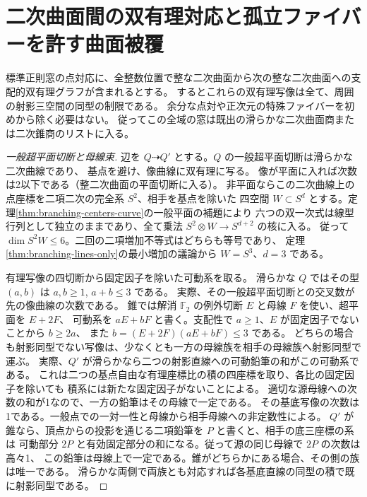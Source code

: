 \section{二次曲面間の双有理対応と孤立ファイバーを許す曲面被覆}
\label{sec:birational-quadric-chains}
\begin{theorem}\label{thm:birational-quadric-chains}
標準正則窓の点対応に、全整数位置で整な二次曲面から次の整な二次曲面への支配的双有理グラフが含まれるとする。
するとこれらの双有理写像は全て、周囲の射影三空間の同型の制限である。
余分な点対や正次元の特殊ファイバーを初めから除く必要はない。
従ってこの全域の窓は既出の滑らかな二次曲面商または二次錐商のリストに入る。
\end{theorem}

\begin{proof}[一般超平面切断と母線束]
辺を $Q\dashrightarrow Q'$ とする。$Q$ の一般超平面切断は滑らかな二次曲線であり、
基点を避け、像曲線に双有理に写る。
像が平面に入れば次数は2以下である（整二次曲面の平面切断に入る）。
非平面ならこの二次曲線上の点座標を二項二次の完全系 $S^2$、相手を基点を除いた
四空間 $W\subset S^d$ とする。定理\ref{thm:branching-centers-curve}の一般平面の補題により
六つの双一次式は線型行列として独立のままであり、全て乗法 $S^2\otimes W\to S^{d+2}$ の核に入る。
従って $\dim S^2 W\le6$。二回の二項増加不等式はどちらも等号であり、
定理\ref{thm:branching-lines-only}の最小増加の議論から $W=S^3$、$d=3$ である。

有理写像の四切断から固定因子を除いた可動系を取る。
滑らかな $Q$ ではその型 $(a,b)$ は $a,b\ge1$, $a+b\le3$ である。
実際、その一般超平面切断との交叉数が先の像曲線の次数である。
錐では解消 $\mathbb F_2$ の例外切断 $E$ と母線 $F$ を使い、超平面を $E+2F$、
可動系を $aE+bF$ と書く。支配性で $a\ge1$、$E$ が固定因子でないことから $b\ge2a$、
また $b=(E+2F)(aE+bF)\le3$ である。
どちらの場合も射影同型でない写像は、少なくとも一方の母線族を相手の母線族へ射影同型で運ぶ。
実際、$Q'$ が滑らかなら二つの射影直線への可動鉛筆の和がこの可動系である。
これは二つの基点自由な有理座標比の積の四座標を取り、各比の固定因子を除いても
積系には新たな固定因子がないことによる。
適切な源母線への次数の和が1なので、一方の鉛筆はその母線で一定である。
その基底写像の次数は1である。一般点での一対一性と母線から相手母線への非定数性による。
$Q'$ が錐なら、頂点からの投影を通じる二項鉛筆を $P$ と書くと、相手の底三座標の系は
可動部分 $2P$ と有効固定部分の和になる。従って源の同じ母線で $2P$ の次数は高々1、
この鉛筆は母線上で一定である。錐がどちらかにある場合、その側の族は唯一である。
滑らかな両側で両族とも対応すれば各基底直線の同型の積で既に射影同型である。


\end{proof}
